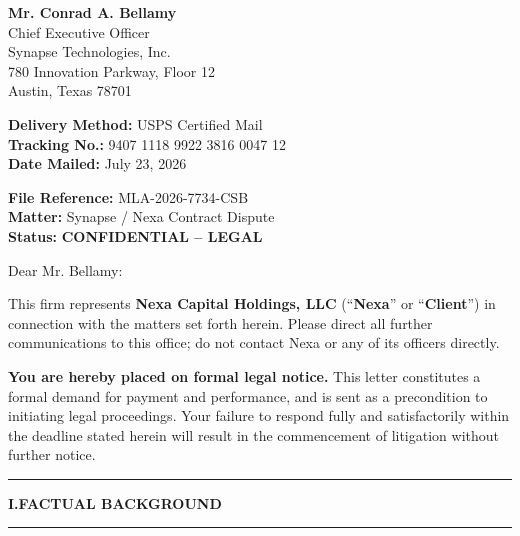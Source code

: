 \documentclass[
  paper=letter,
  fontsize=10.5pt,
  parskip=half,
  firsthead=true,
  fromalign=right,
  fromrule=false,
  addrfield=topaligned,
  subject=titled,
  foldmarks=false
]{scrlttr2}
\newcommand{\sectionrule}{%
  \par\vspace{2pt}%
  {\color{GoldAccent}\rule{\linewidth}{0.8pt}}%
  \par\vspace{4pt}%
}
\newcommand{\claimlabel}[1]{%
  {\sffamily\bfseries\color{NavyDeep}\small #1}%
}
\newcommand{\iconitem}[2]{%
  \noindent\makebox[1.4em][c]{{\color{GoldAccent}#1}}\hspace{0.4em}#2%
}
\begin{document}
\begin{letter}{%
  \textbf{Mr. Conrad A. Bellamy}\\
  Chief Executive Officer\\
  Synapse Technologies, Inc.\\
  780 Innovation Parkway, Floor 12\\
  Austin, Texas 78701%
}

\begin{tcolorbox}[trackingstyle]
  \begin{minipage}[t]{0.48\linewidth}
    \iconitem{\faEnvelope}{\claimlabel{Delivery Method:} USPS Certified Mail}\\[3pt]
    \iconitem{\faBarcode}{\claimlabel{Tracking No.:} 9407 1118 9922 3816 0047 12}\\[3pt]
    \iconitem{\faCalendar}{\claimlabel{Date Mailed:} July 23, 2026}
  \end{minipage}%
  \hfill%
  \begin{minipage}[t]{0.48\linewidth}
    \iconitem{\faCopy}{\claimlabel{File Reference:} MLA-2026-7734-CSB}\\[3pt]
    \iconitem{\faFile}{\claimlabel{Matter:} Synapse / Nexa Contract Dispute}\\[3pt]
    \iconitem{\faLock}{\claimlabel{Status:} \textcolor{RubyAlert}{\bfseries CONFIDENTIAL -- LEGAL}}
  \end{minipage}
\end{tcolorbox}

\vspace{6pt}

\opening{Dear Mr. Bellamy:}

This firm represents \textbf{Nexa Capital Holdings, LLC} (\textquotedblleft\textbf{Nexa}\textquotedblright{} or \textquotedblleft\textbf{Client}\textquotedblright) in connection with the matters set forth herein. Please direct all further communications to this office; do not contact Nexa or any of its officers directly.

\textbf{You are hereby placed on formal legal notice.} This letter constitutes a formal demand for payment and performance, and is sent as a precondition to initiating legal proceedings. Your failure to respond fully and satisfactorily within the deadline stated herein will result in the commencement of litigation without further notice.

\vspace{4pt}
\sectionrule
{\sffamily\bfseries\color{NavyDeep}\normalsize I.\enspace FACTUAL BACKGROUND}
\sectionrule


\end{letter}
\end{document}
